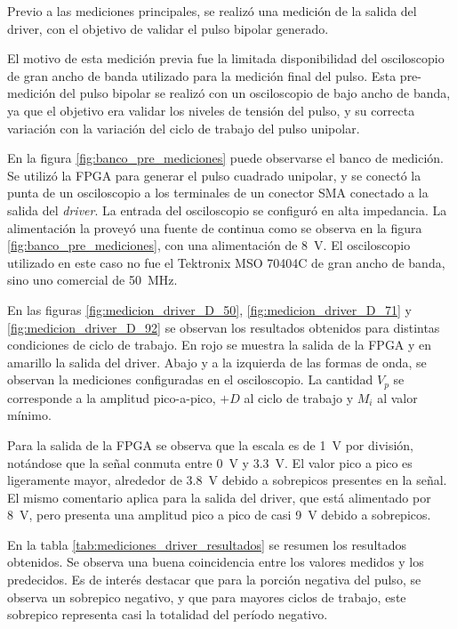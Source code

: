 Previo a las mediciones principales, se realizó una medición de la salida del driver,
con el objetivo de validar el pulso bipolar generado.

El motivo de esta medición previa fue la limitada disponibilidad del
osciloscopio de gran ancho de banda utilizado para la medición final del pulso.
Esta pre-medición del pulso bipolar se realizó con un osciloscopio de bajo ancho
de banda, ya que el objetivo era validar los niveles de tensión del pulso, y su
correcta variación con la variación del ciclo de trabajo del pulso unipolar.

En la figura \ref{fig:banco_pre_mediciones} puede observarse el banco de
medición. Se utilizó la FPGA para generar el pulso cuadrado unipolar, y se
conectó la punta de un osciloscopio a los terminales de un conector SMA
conectado a la salida del \textit{driver}. La entrada del osciloscopio se
configuró en alta impedancia. La alimentación la proveyó una fuente de continua
como se observa en la figura \ref{fig:banco_pre_mediciones}, con una
alimentación de \qty{8}{\volt}. El osciloscopio utilizado en este caso no fue el
Tektronix MSO 70404C de gran ancho de banda, sino uno comercial de
\qty{50}{\mega\hertz}.

En las figuras \ref{fig:medicion_driver_D_50}, \ref{fig:medicion_driver_D_71} y
\ref{fig:medicion_driver_D_92} se observan los resultados obtenidos para distintas
condiciones de ciclo de trabajo. En rojo se muestra la salida de la FPGA y en
amarillo la salida del driver. Abajo y a la izquierda de las formas de onda,
se observan la mediciones configuradas en el osciloscopio. La cantidad $V_p$ se
corresponde a la amplitud pico-a-pico, $+D$ al ciclo de trabajo y $M_i$ al valor
mínimo.

Para la salida de la FPGA se observa que la escala es de \qty{1}{\volt} por
división, notándose que la señal conmuta entre \qty{0}{\volt} y
\qty{3.3}{\volt}. El valor pico a pico es ligeramente mayor, alrededor de
\qty{3.8}{\volt} debido a sobrepicos presentes en la señal. El mismo comentario
aplica para la salida del driver, que está alimentado por \qty{8}{\volt}, pero
presenta una amplitud pico a pico de casi \qty{9}{\volt} debido a sobrepicos.

En la tabla \ref{tab:mediciones_driver_resultados} se resumen los resultados
obtenidos. Se observa una buena coincidencia entre los valores medidos y los
predecidos. Es de interés destacar que para la porción negativa del pulso, se
observa un sobrepico negativo, y que para mayores ciclos de trabajo, este
sobrepico representa casi la totalidad del período negativo.

